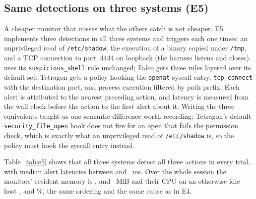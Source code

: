 \subsection{Same detections on three systems (E5)}
\label{sec:eval:e5}
A cheaper monitor that misses what the others catch is not cheaper. E5
implements three detections in all three systems and triggers each one
\eFiveTrials{} times: an unprivileged read of \texttt{/etc/shadow}, the
execution of a binary copied under \texttt{/tmp}, and a TCP connection to
port~4444 on loopback (the harness listens and closes). \sys uses its
\texttt{suspicious\_shell} rule unchanged; Falco gets three rules layered
over its default set; Tetragon gets a policy hooking the \texttt{openat}
syscall entry, \texttt{tcp\_connect} with the destination port, and process
execution filtered by path prefix. Each alert is attributed to the nearest
preceding action, and latency is measured from the wall clock before the
action to the first alert about it. Writing the three equivalents taught us
one semantic difference worth recording: Tetragon's default
\texttt{security\_file\_open} hook does not fire for an open that fails the
permission check, which is exactly what an unprivileged read of
\texttt{/etc/shadow} is, so the policy must hook the syscall entry instead.

Table~\ref{tab:e5} shows that all three systems detect all three actions
in every trial, with median alert latencies between \eFiveLatencyFalcoTmpExec{}
and \eFiveLatencyWsShadow{}~ms. Over the whole session the monitors' resident
memory is \eFiveRssWs{}, \eFiveRssFalco{} and \eFiveRssTetragon{}~MiB and
their CPU on an otherwise idle host \eFiveCpuWs{}, \eFiveCpuFalco{} and
\eFiveCpuTetragon{}\%, the same ordering and the same cause as in E4.

\begin{table}[t]
\caption{E5: the same three detections in three systems, \eFiveTrials{}
trials each. Latency is from the action to its first alert. Produced by
\texttt{e5\_fair\_comparison.py} from \texttt{e5/e5\_results.json}.}
\label{tab:e5}
\centering\scriptsize

\end{table}

